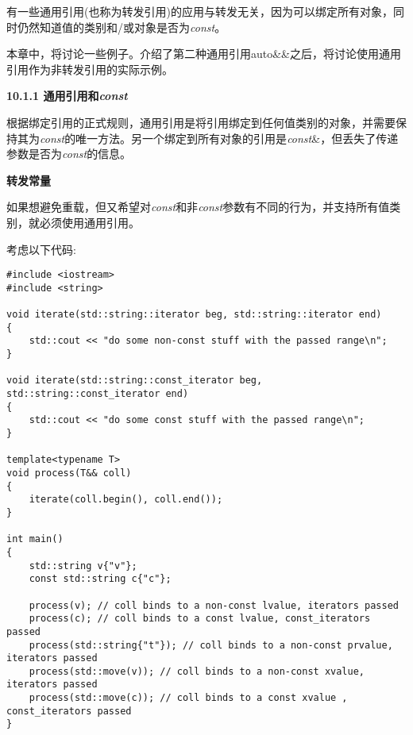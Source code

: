 有一些通用引用(也称为转发引用)的应用与转发无关，因为可以绑定所有对象，同时仍然知道值的类别和/或对象是否为\textit{const}。\par

本章中，将讨论一些例子。介绍了第二种通用引用auto\&\&之后，将讨论使用通用引用作为非转发引用的实际示例。\par

\hspace*{\fill} \par %
\textbf{10.1.1 通用引用和\textit{const}}

根据绑定引用的正式规则，通用引用是将引用绑定到任何值类别的对象，并需要保持其为\textit{const}的唯一方法。另一个绑定到所有对象的引用是\textit{const}\&，但丢失了传递参数是否为\textit{const}的信息。\par

\hspace*{\fill} \par %
\textbf{转发常量}

如果想避免重载，但又希望对\textit{const}和非\textit{const}参数有不同的行为，并支持所有值类别，就必须使用通用引用。\par

考虑以下代码:\par

{\color{red}{generic/universalconst.cpp}}\par

\begin{lstlisting}[caption={}]
#include <iostream>
#include <string>

void iterate(std::string::iterator beg, std::string::iterator end)
{
	std::cout << "do some non-const stuff with the passed range\n";
}

void iterate(std::string::const_iterator beg, std::string::const_iterator end)
{
	std::cout << "do some const stuff with the passed range\n";
}

template<typename T>
void process(T&& coll)
{
	iterate(coll.begin(), coll.end());
}

int main()
{
	std::string v{"v"};
	const std::string c{"c"};
	
	process(v); // coll binds to a non-const lvalue, iterators passed
	process(c); // coll binds to a const lvalue, const_iterators passed
	process(std::string{"t"}); // coll binds to a non-const prvalue, iterators passed
	process(std::move(v)); // coll binds to a non-const xvalue, iterators passed
	process(std::move(c)); // coll binds to a const xvalue , const_iterators passed
}
\end{lstlisting}

